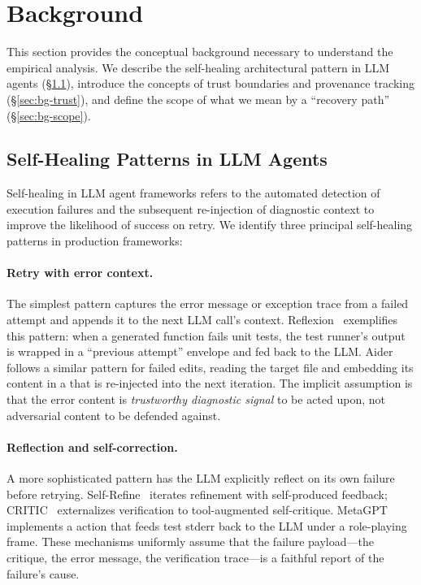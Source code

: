 
\section{Background}
\label{sec:background}

This section provides the conceptual background necessary to understand the empirical analysis. We describe the self-healing architectural pattern in LLM agents (\S\ref{sec:bg-selfhealing}), introduce the concepts of trust boundaries and provenance tracking (\S\ref{sec:bg-trust}), and define the scope of what we mean by a ``recovery path'' (\S\ref{sec:bg-scope}).

\subsection{Self-Healing Patterns in LLM Agents}
\label{sec:bg-selfhealing}

Self-healing in LLM agent frameworks refers to the automated detection of execution failures and the subsequent re-injection of diagnostic context to improve the likelihood of success on retry. We identify three principal self-healing patterns in production frameworks:

\paragraph{Retry with error context.}
The simplest pattern captures the error message or exception trace from a failed attempt and appends it to the next LLM call's context. Reflexion~\cite{reflexion} exemplifies this pattern: when a generated function fails unit tests, the test runner's output is wrapped in a ``previous attempt'' envelope and fed back to the LLM. Aider~\cite{aider-code} follows a similar pattern for failed  edits, reading the target file and embedding its content in a  that is re-injected into the next iteration. The implicit assumption is that the error content is \emph{trustworthy diagnostic signal} to be acted upon, not adversarial content to be defended against.

\paragraph{Reflection and self-correction.}
A more sophisticated pattern has the LLM explicitly reflect on its own failure before retrying. Self-Refine~\cite{self-refine} iterates refinement with self-produced feedback; CRITIC~\cite{critic} externalizes verification to tool-augmented self-critique. MetaGPT~\cite{meta-agent} implements a  action that feeds test stderr back to the LLM under a role-playing frame. These mechanisms uniformly assume that the failure payload---the critique, the error message, the verification trace---is a faithful report of the failure's cause.

